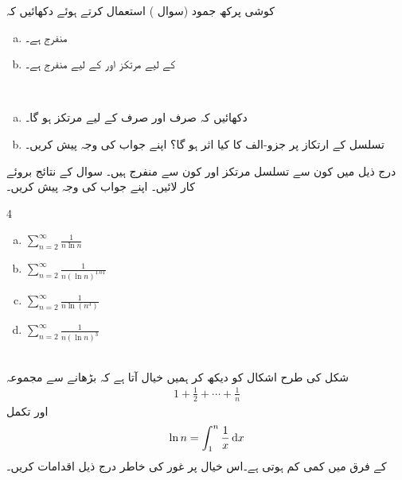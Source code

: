 کوشی پرکھ جمود (سوال ) استعمال کرتے ہوئے دکھائیں کہ
\begin{enumerate}[a.]
\item
{} منفرج ہے۔
\item
{} کے لیے  مرتکز اور  کے لیے منفرج ہے۔
\end{enumerate}
\\
\begin{enumerate}[a.]
\item
دکھائیں کہ صرف اور صرف  کے لیے   مرتکز ہو گا۔
\item
تسلسل  کے  ارتکاز پر جزو-الف کا کیا اثر ہو گا؟ اپنے جواب کی وجہ پیش کریں۔
\end{enumerate}
درج ذیل میں کون سے تسلسل مرتکز اور کون سے منفرج ہیں۔ سوال  کے نتائج بروئے کار لائیں۔ اپنے جواب کی وجہ پیش کریں۔
\begin{multicols}{4}
\begin{enumerate}[a.]
\item
$\sum\limits_{n=2}^{\infty}\frac{1}{n\ln n}$
\item
$\sum\limits_{n=2}^{\infty}\frac{1}{n(\ln n)^{1.01}}$
\item
$\sum\limits_{n=2}^{\infty}\frac{1}{n\ln (n^3)}$
\item
$\sum\limits_{n=2}^{\infty}\frac{1}{n(\ln n)^3}$
\end{enumerate}
\end{multicols}
\\
شکل  کی طرح اشکال کو دیکھ کر ہمیں خیال آتا ہے کہ  بڑھانے سے  مجموعہ
\begin{align*}
1+\frac{1}{2}+\cdots+\frac{1}{n}
\end{align*}
 اور تکمل
\begin{align*}
\ln n=\int_1^n\frac{1}{x}\dif x
\end{align*}
کے فرق میں کمی کم ہوتی ہے۔اس خیال پر غور کی خاطر درج ذیل اقدامات  کریں۔
